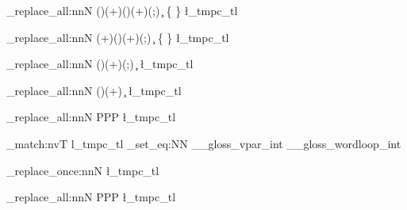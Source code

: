 {	%
		\regex_replace_all:nnN
				{ (\:\:)(\w+)(\!)(\w+)(;) }
				{ \c{\2} \cB\{ \4 \cE\}  }
				\l_tmpc_tl


		\regex_replace_all:nnN
				{ (\w+)(\:\:)(\w+)(;) }
				{ \c{\3} \cB\{ \1 \cE\}  }
				\l_tmpc_tl
			

			
		\regex_replace_all:nnN
				{ (\:)(\w+)(;) }
				{ \c{\2}  }
				\l_tmpc_tl




				
		\regex_replace_all:nnN
				{ (\:)(\w+) }
				{ \c{\2}  }
				\l_tmpc_tl
				

		\regex_replace_all:nnN
				{ \+\+ }
				{ PPP }
				\l_tmpc_tl

		\regex_match:nvT
				{ \+ }
				{ l_tmpc_tl } 
				{ \int_set_eq:NN 
							\g__gloss_vpar_int 
							\g__gloss_wordloop_int }


		\regex_replace_once:nnN
				{ \+ }
				{  }
				\l_tmpc_tl

		\regex_replace_all:nnN
				{ PPP }
				{ \+ }
				\l_tmpc_tl


}




